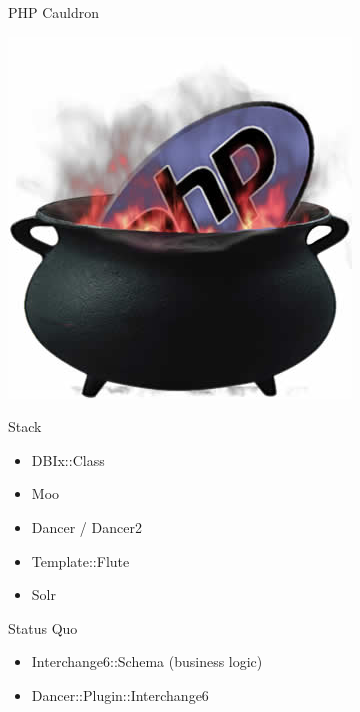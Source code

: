\begin{frame}{PHP Cauldron}
  \begin{center}
    \includegraphics[width=\textwidth,height=0.8\textheight,keepaspectratio]{images/cauldron.jpg}
  \end{center}
\end{frame}

\begin{frame}{Stack}
  \begin{itemize}
  \item DBIx::Class
  \item Moo
  \item Dancer / Dancer2
  \item Template::Flute
  \item Solr
  \end{itemize}
\end{frame}

\begin{frame}{Status Quo}
\begin{itemize}
 \item Interchange6::Schema (business logic)
  \item Dancer::Plugin::Interchange6
\end{itemize}
\end{frame}

